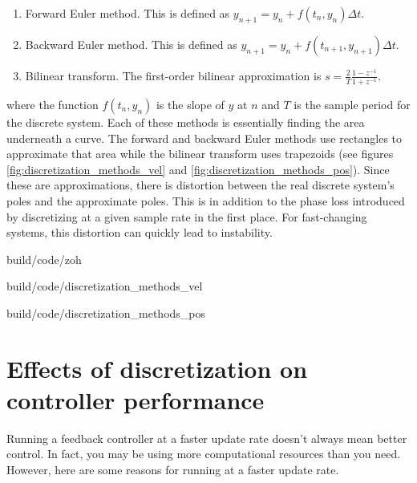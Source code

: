 \begin{enumerate}
  \item Forward Euler method. This is defined as
    $y_{n+1} = y_n + f(t_n, y_n) \Delta t$.
  \item Backward Euler method. This is defined as
    $y_{n+1} = y_n + f(t_{n+1}, y_{n+1}) \Delta t$.
  \item Bilinear transform. The first-order bilinear approximation is
    $s = \frac{2}{T} \frac{1 - z^{-1}}{1 + z^{-1}}$.
\end{enumerate}

where the function $f(t_n, y_n)$ is the slope of $y$ at $n$ and $T$ is the
sample period for the discrete \gls{system}. Each of these methods is
essentially finding the area underneath a curve. The forward and backward Euler
methods use rectangles to approximate that area while the bilinear transform
uses trapezoids (see figures \ref{fig:discretization_methods_vel} and
\ref{fig:discretization_methods_pos}). Since these are approximations, there is
distortion between the real discrete \gls{system}'s poles and the approximate
poles. This is in addition to the phase loss introduced by discretizing at a
given sample rate in the first place. For fast-changing \glspl{system}, this
distortion can quickly lead to instability.

\begin{svg}{build/code/zoh}
    \caption{Zero-order hold of a system response}
    \label{fig:zoh}
\end{svg}

\begin{svg}{build/code/discretization_methods_vel}
  \caption{Discretization methods applied to velocity data}
  \label{fig:discretization_methods_vel}
\end{svg}

\begin{svg}{build/code/discretization_methods_pos}
  \caption{Position plot of discretization methods applied to velocity data}
  \label{fig:discretization_methods_pos}
\end{svg}

\section{Effects of discretization on controller performance}

Running a feedback controller at a faster update rate doesn't always mean better
control. In fact, you may be using more computational resources than you need.
However, here are some reasons for running at a faster update rate.

